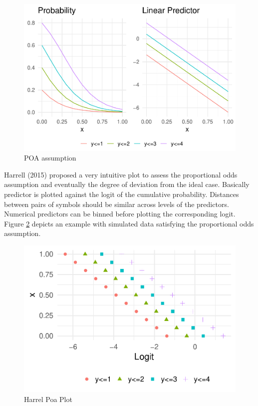\documentclass[
  man,floatsintext]{apa6}
\begin{document}
\begin{figure}

{\centering \includegraphics{paper-new_files/figure-latex/poa-plot-example-1} 

}

\caption{POA assumption}\label{fig:poa-plot-example}
\end{figure}

\normalsize

Harrell (2015) proposed a very intuitive plot to assess the proportional odds assumption and eventually the degree of deviation from the ideal case. Basically predictor is plotted against the logit of the cumulative probability. Distances between pairs of symbols should be similar across levels of the predictors. Numerical predictors can be binned before plotting the corresponding logit. Figure \ref{fig:harrel-poa-plot} depicts an example with simulated data satisfying the proportional odds assumption.

\scriptsize

\begin{figure}

{\centering \includegraphics{paper-new_files/figure-latex/harrel-poa-plot-1} 

}

\caption{Harrel Poa Plot}\label{fig:harrel-poa-plot}
\end{figure}
\end{document}

